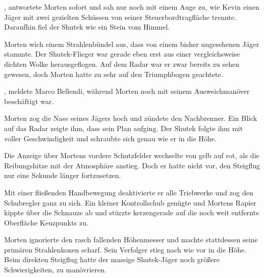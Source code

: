 , antwortete Morten sofort und sah nur noch mit einem Auge zu, wie Kevin einen Jäger mit zwei gezielten Schüssen von seiner Steuerbordtragfläche trennte. Daraufhin fiel der Shutek wie ein Stein vom Himmel. 

\par

Morten wich einem Strahlenbündel aus, dass von einem bisher ungesehenen Jäger stammte. Der Shutek-Flieger war gerade eben erst aus einer vergleichsweise dichten Wolke herausgeflogen. Auf dem Radar war er zwar bereits zu sehen gewesen, doch Morten hatte zu sehr auf den Triumphbogen geachtete.

\par

, meldete Marco Bellendi, während Morten noch mit seinem Ausweichmanöver beschäftigt war. 

\par

Morten zog die Nase seines Jägers hoch und zündete den Nachbrenner. Ein Blick auf das Radar zeigte ihm, dass sein Plan aufging. Der Shutek folgte ihm mit voller Geschwindigkeit und schraubte sich genau wie er in die Höhe.

\par

Die Anzeige über Mortens vordere Schutzfelder wechselte von gelb auf rot, als die Reibungshitze mit der Atmosphäre anstieg. Doch er hatte nicht vor, den Steigflug nur eine Sekunde länger fortzusetzen.

\par

Mit einer fließenden Handbewegung deaktivierte er alle Triebwerke und zog den Schubregler ganz zu sich. Ein kleiner Kontrollschub genügte und Mortens Rapier kippte über die Schnauze ab und stürzte kerzengerade auf die noch weit entfernte Oberfläche Keuzpunkts zu.

\par

Morten ignorierte den rasch fallenden Höhenmesser und machte stattdessen seine primären Strahlenkonen scharf. Sein Verfolger stieg nach wie vor in die Höhe. Beim direkten Steigflug hatte der massige Shutek-Jäger noch größere Schwierigkeiten, zu manövrieren.

